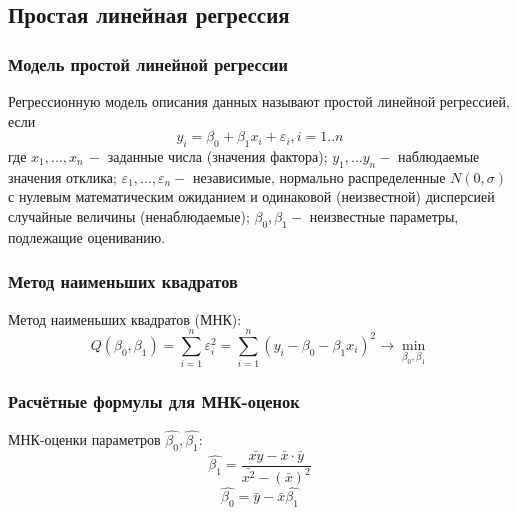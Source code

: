 \subsection{Простая линейная регрессия}
\subsubsection{Модель простой линейной регрессии}
\begin{flushleft}
	Регрессионную модель описания данных называют простой линейной регрессией, если
	\begin{equation}
		y_{i} = \beta_{0} + \beta_{1}x_{i} + \varepsilon_{i},  i = 1..n
		\label{y_i}
	\end{equation}
	где $x_1,...,x_n \,- $ заданные числа (значения фактора);
	$y_1,...y_n - $ наблюдаемые значения отклика;
	$\varepsilon_1,...,\varepsilon_n - $ независимые, нормально распределенные $N(0, \sigma)$ с нулевым математическим ожиданием и одинаковой (неизвестной) дисперсией случайные величины (ненаблюдаемые);
	$\beta_0, \beta_1 - $ неизвестные параметры, подлежащие оцениванию.
\end{flushleft}

\subsubsection{Метод наименьших квадратов}
\begin{flushleft}
	Метод наименьших квадратов (МНК):
	\begin{equation}
		Q(\beta_{0}, \beta_{1}) = \sum_{i=1}^{n}{\varepsilon_{i}^{2}} = 
		\sum_{i=1}^{n}{(y_{i} - \beta_{0} - \beta_{1}x_{i})^{2}}\rightarrow \min_{\beta_{0}, \beta_{1}}
		\label{Q_beta}
	\end{equation}
\end{flushleft}

\subsubsection{Расчётные формулы для МНК-оценок}
\begin{flushleft}
	МНК-оценки параметров $\hat{\beta_0}, \hat{\beta_1}$:
	\begin{equation}
		\hat{\beta_{1}} = \frac{\bar{xy} - \bar{x} \cdot \bar{y}}{\bar{x^{2}} - (\bar{x})^{2}}
		\label{beta_1_new}
	\end{equation}
	\begin{equation}
		\hat{\beta_{0}} = \bar{y} - \bar{x}\hat{\beta_{1}}
		\label{beta_0_new}
	\end{equation}
\end{flushleft}

